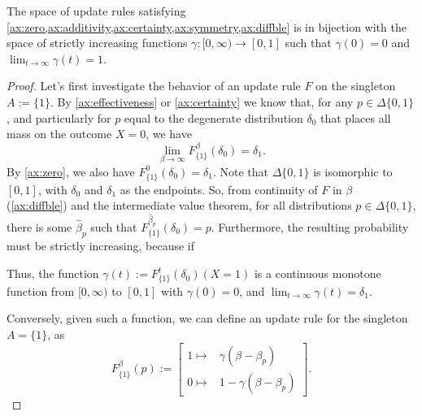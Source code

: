 \documentclass{article}
\begin{document}
\begin{claim}
The space of update rules satisfying
\cref{ax:zero,ax:additivity,ax:certainty,ax:symmetry,ax:diffble}
is in bijection with the space of strictly increasing functions
$\gamma : [0,\infty) \to [0,1]$
such that
$\gamma(0) = 0$ and $\lim_{t\to\infty}\gamma(t) = 1$.
\end{claim}
\begin{proof}
    Let's first investigate the behavior of an update rule $F$ on the singleton $A := \{1\}$.
    By \ref{ax:effectiveness} or \cref{ax:certainty} we know that, for any $p \in \Delta\{0,1\}$, and particularly for $p$ equal to the degenerate distribution $\delta_0$ that places all mass on the outcome $X=0$, we have
    \[
        \lim_{\beta \to \infty} F^\beta_{\{1\}}(\delta_0) = \delta_1.
    \]
    By \cref{ax:zero}, we also have $F^0_{\{1\}}(\delta_0) = \delta_1$. Note that $\Delta\{0,1\}$ is isomorphic to $[0,1]$, with $\delta_0$ and $\delta_1$ as the endpoints.  So, from continuity of $F$ in $\beta$ (\cref{ax:diffble}) and the intermediate value theorem, for all distributions $p \in \Delta\{0,1\}$, there is some $\hat\beta_p$ such that $F^{\hat\beta_p}_{\{1\}}(\delta_0) = p$.
    Furthermore, the resulting probability must be strictly increasing, because if

    Thus, the function $\gamma(t) := F^{t}_{\{1\}}(\delta_0)(X=1)$ is a continuous monotone function from $[0,\infty)$ to $[0,1]$ with $\gamma(0) = 0$,
    and $\lim_{t\to\infty} \gamma(t) = \delta_1$.


    Conversely, given such a function, we can define an update rule for the singleton $A = \{1\}$, as
    \[
        F^{\beta}_{\{1\}}(p) :=
        \begin{bmatrix}
            1 \mapsto& \gamma(\beta - \beta_p) \\
            0 \mapsto& 1-\gamma(\beta - \beta_p)
        \end{bmatrix}.
    \]
\end{proof}
\end{document}
